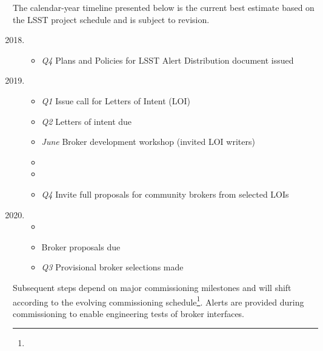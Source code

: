 The calendar-year timeline presented below is the current best estimate based on the LSST project schedule and is subject to revision.
{
	\renewcommand\labelenumi{\textbf{\theenumi}}
\begin{enumerate}
  \setcounter{enumi}{2017}
	\item \begin{itemize} %
		\item \textit{Q4} Plans and Policies for LSST Alert Distribution document issued
	\end{itemize}
	\item \begin{itemize}%
		\item \textit{Q1} Issue call for Letters of Intent (LOI)
		\item \textit{Q2} Letters of intent due
		\item \textit{June} Broker development workshop (invited LOI writers)
		\item {}
		\item {}
		\item \textit{Q4}  Invite full proposals for community brokers from selected LOIs
		\end{itemize}
	\item \begin{itemize} %
		\item {}
		\item {} Broker proposals due
		\item \textit{Q3} Provisional broker selections made
		\end{itemize}
\end{enumerate}
}

Subsequent steps depend on major commissioning milestones and will shift according to the evolving commissioning schedule\footnote{}.
Alerts are provided during commissioning to enable engineering tests of broker interfaces.

